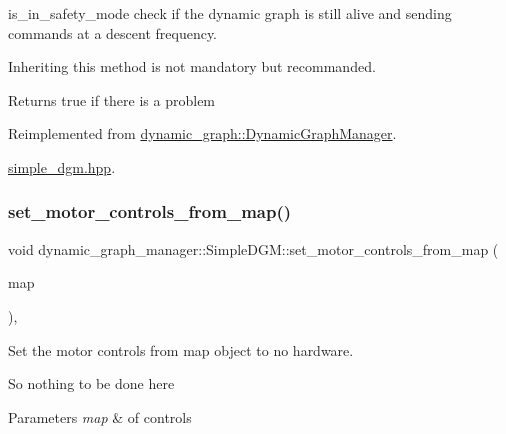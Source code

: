is\+\_\+in\+\_\+safety\+\_\+mode check if the dynamic graph is still alive and sending commands at a descent frequency. 

Inheriting this method is not mandatory but recommanded. \begin{DoxyReturn}{Returns}
true if there is a problem 
\end{DoxyReturn}


Reimplemented from \hyperlink{classdynamic__graph_1_1DynamicGraphManager_aea29e8dc351e0a50a8d2803d854d238d}{dynamic\+\_\+graph\+::\+Dynamic\+Graph\+Manager}.

\begin{Desc}
\item[Examples\+: ]\par
\hyperlink{simple_dgm_8hpp-example}{simple\+\_\+dgm.\+hpp}.\end{Desc}
\mbox{\label{classdynamic__graph__manager_1_1SimpleDGM_ad38ccd35cc0c409a0aaefa8565634109}} 
\subsubsection{\texorpdfstring{set\+\_\+motor\+\_\+controls\+\_\+from\+\_\+map()}{set\_motor\_controls\_from\_map()}}
{\footnotesize\ttfamily void dynamic\+\_\+graph\+\_\+manager\+::\+Simple\+D\+G\+M\+::set\+\_\+motor\+\_\+controls\+\_\+from\+\_\+map (\begin{DoxyParamCaption}\item[{const \hyperlink{namespacedynamic__graph_a51212ed7fa4ae81e7b362a27f09b7ab8}{dynamic\+\_\+graph\+::\+Vector\+D\+G\+Map} \&}]{map }\end{DoxyParamCaption})\hspace{0.3cm}{\ttfamily [inline]}, {\ttfamily [virtual]}}



Set the motor controls from map object to no hardware. 

So nothing to be done here


\begin{DoxyParams}{Parameters}
{\em map} & of controls \\
\hline
\end{DoxyParams}


